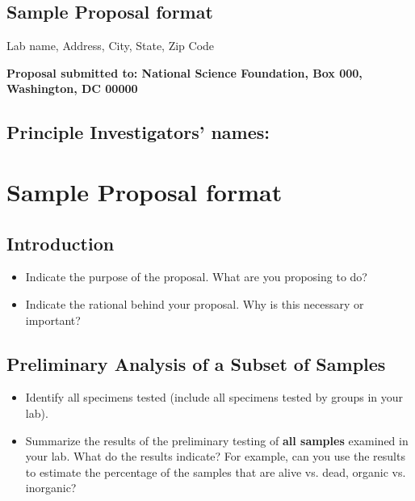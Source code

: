 \documentclass[12pt,a4paper]{article}
\begin{document}
\begin{center}
\section*{Sample Proposal format}
Lab name, Address, City, State, Zip Code
\end{center}
{\bf Proposal submitted to: National Science Foundation, Box 000, Washington, DC 00000}
\subsection*{Principle Investigators' names:}
\section*{Sample Proposal format}
\subsection*{Introduction}
\begin{itemize}
\item Indicate the purpose of the proposal. What are you proposing to do?
\item Indicate the rational behind your proposal. Why is this necessary or important?
\end{itemize}
\subsection*{Preliminary Analysis of a Subset of Samples}
\begin{itemize}
\item Identify all specimens tested (include all specimens tested by groups in your lab).
\item Summarize the results of the preliminary testing of {\bf all samples} examined in your lab. What do the results indicate? For example, can you use the results to estimate the percentage of the samples that are alive vs. dead, organic vs. inorganic?
\end{itemize}
\end{document}
